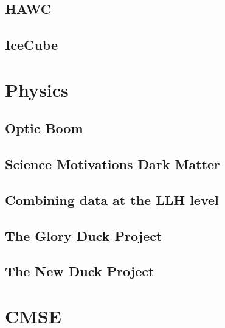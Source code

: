\documentclass[a4paper, 12pt]{article}
\begin{document}
\subsection{}

\subsection{HAWC}
\subsection{IceCube}

\section{Physics}
\subsection{Optic Boom}
\subsection{Science Motivations Dark Matter}
\subsection{Combining data at the LLH level}
\subsection{The Glory Duck Project}
\subsection{The New Duck Project}

\section{CMSE}
\end{document}
